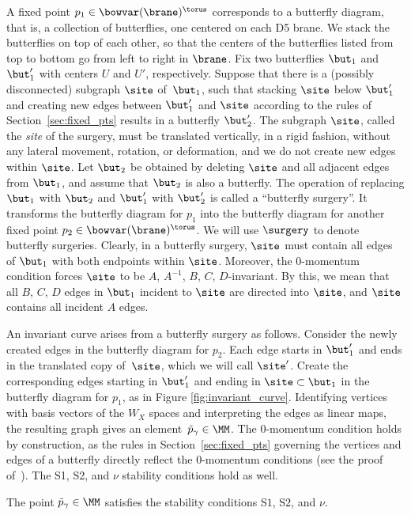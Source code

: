 A fixed point $p_1\in \bowvar(\brane)^\torus$ corresponds to a butterfly diagram, that is, a collection of butterflies, one centered on each D5 brane. We stack the butterflies on top of each other, so that the centers of the butterflies listed from top to bottom go from left to right in $\brane$. Fix two butterflies $\but_1$ and~$\but'_1$ with centers $U$ and $U'$, respectively. Suppose that there is a (possibly disconnected) subgraph $\site$ of~$\but_1$, such that stacking $\site$ below $\but'_1$ and creating new edges between $\but'_1$ and $\site$ according to the rules of Section~\ref{sec:fixed_pts} results in a butterfly $\but'_2$. The subgraph $\site$, called the \emph{site} of the surgery, must be translated vertically, in a rigid fashion, without any lateral movement, rotation, or deformation, and we do not create new edges within $\site$. Let $\but_2$ be obtained by deleting $\site$ and all adjacent edges from $\but_1$, and assume that $\but_2$ is also a butterfly. The operation of replacing $\but_1$ with $\but_2$ and $\but'_1$ with $\but'_2$ is called a ``butterfly surgery''. It transforms the butterfly diagram for $p_1$ into the butterfly diagram for another fixed point $p_2\in \bowvar(\brane)^\torus$. We will use $\surgery$ to denote butterfly surgeries. Clearly, in a butterfly surgery, $\site$ must contain all edges of $\but_1$ with both endpoints within $\site$. Moreover, the 0-momentum condition forces $\site$ to be $A$, $A^{-1}$, $B$, $C$, $D$-invariant. By this, we mean that all $B$, $C$, $D$ edges in $\but_1$ incident to $\site$ are directed into $\site$, and $\site$ contains all incident $A$ edges.

An invariant curve arises from a butterfly surgery as follows. Consider the newly created edges in the butterfly diagram for $p_2$. Each edge starts in $\but'_1$ and ends in the translated copy of~$\site$, which we will call $\site'$. Create the corresponding edges starting in $\but'_1$ and ending in $\site\subset\but_1$ in the butterfly diagram for $p_1$, as in Figure \ref{fig:invariant_curve}. Identifying vertices with basis vectors of the $W_X$ spaces and interpreting the edges as linear maps, the resulting graph gives an element~${\tilde{p}_\gamma \in \MM}$. The 0-momentum condition holds by construction, as the rules in Section~\ref{sec:fixed_pts} governing the vertices and edges of a butterfly directly reflect the 0-momentum conditions (see the proof of~\cite[Theorem~4.8]{RS}). The S1, S2, and $\nu$ stability conditions hold as well.

\begin{Lemma} \label{lemma:type1_curve}
The point $\tilde{p}_\gamma \in \MM$ satisfies the stability conditions S$1$, S$2$, and $\nu$.
\end{Lemma}

